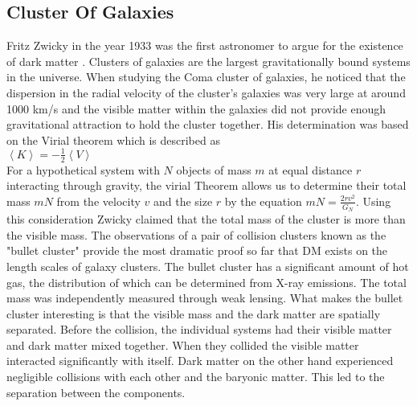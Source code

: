 \subsection{Cluster Of Galaxies}
\hspace{0.5cm}Fritz Zwicky in the year 1933 was the first astronomer to argue for the existence of dark matter \cite{1937ApJ....86..217Z}. Clusters of galaxies are the largest gravitationally bound systems in the universe. When studying the
Coma cluster of galaxies, he noticed that the dispersion in the radial velocity of the cluster’s galaxies was very large at around 1000 km/s and the visible matter within the galaxies did not provide enough gravitational attraction to hold the cluster together. His determination was based on the Virial theorem which is described as\\ $\left<K\right> = -\frac{1}{2}\left<V\right>$\\
\hspace{0.5cm}For a hypothetical system with $N$ objects of mass $m$ at equal distance $r$ interacting through gravity, the virial Theorem allows us  to determine their total mass $mN$ from the velocity $v$ and the size $r$ by the equation $mN =
\frac{2rv^2}{G_{N}}$. Using this consideration Zwicky claimed that the total mass of the cluster is more than the visible mass. The observations of a pair of collision clusters known as the "bullet cluster" provide the most dramatic proof so far that DM exists on the length scales of galaxy clusters. The bullet cluster has a significant amount of hot gas, the distribution of which can be  determined from X-ray emissions. The total mass was independently measured through weak lensing. What makes the bullet cluster interesting is that the visible mass and the dark matter are spatially separated. Before the collision, the individual systems had their visible matter and dark matter mixed together. When they collided the visible matter interacted significantly with itself. Dark matter on the other hand experienced negligible collisions with each other and the baryonic matter. This led to the separation between the components.

